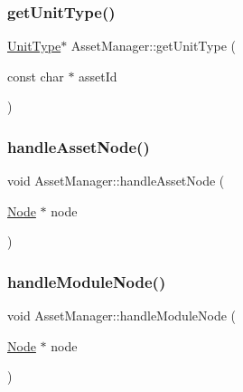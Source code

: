 \mbox{\label{class_asset_manager_a76b1d01c623bbc16f46fd7b51863422a}} 
\subsubsection{\texorpdfstring{get\+Unit\+Type()}{getUnitType()}}
{\footnotesize\ttfamily \hyperlink{class_unit_type}{Unit\+Type}$\ast$ Asset\+Manager\+::get\+Unit\+Type (\begin{DoxyParamCaption}\item[{const char $\ast$}]{asset\+Id }\end{DoxyParamCaption})\hspace{0.3cm}{\ttfamily [inline]}}

\mbox{\label{class_asset_manager_ac8a2d469c747ee3ed69b0756b34b221a}} 
\subsubsection{\texorpdfstring{handle\+Asset\+Node()}{handleAssetNode()}}
{\footnotesize\ttfamily void Asset\+Manager\+::handle\+Asset\+Node (\begin{DoxyParamCaption}\item[{\hyperlink{class_asset_manager_1_1_node}{Node} $\ast$}]{node }\end{DoxyParamCaption})\hspace{0.3cm}{\ttfamily [private]}}

\mbox{\label{class_asset_manager_a8623b7db629dbebb3c27fd19eb1f7bdb}} 
\subsubsection{\texorpdfstring{handle\+Module\+Node()}{handleModuleNode()}}
{\footnotesize\ttfamily void Asset\+Manager\+::handle\+Module\+Node (\begin{DoxyParamCaption}\item[{\hyperlink{class_asset_manager_1_1_node}{Node} $\ast$}]{node }\end{DoxyParamCaption})\hspace{0.3cm}{\ttfamily [private]}}

